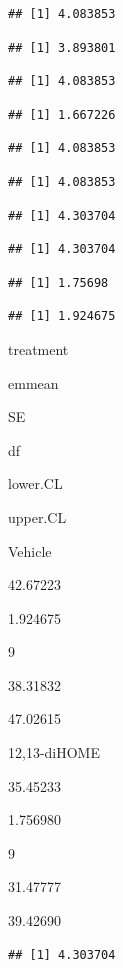 \documentclass[]{book}
\begin{document}
\begin{verbatim}
## [1] 4.083853
\end{verbatim}

\begin{verbatim}
## [1] 3.893801
\end{verbatim}

\begin{verbatim}
## [1] 4.083853
\end{verbatim}

\begin{verbatim}
## [1] 1.667226
\end{verbatim}

\begin{verbatim}
## [1] 4.083853
\end{verbatim}

\begin{verbatim}
## [1] 4.083853
\end{verbatim}

\begin{verbatim}
## [1] 4.303704
\end{verbatim}

\begin{verbatim}
## [1] 4.303704
\end{verbatim}

\begin{verbatim}
## [1] 1.75698
\end{verbatim}

\begin{verbatim}
## [1] 1.924675
\end{verbatim}

treatment

emmean

SE

df

lower.CL

upper.CL

Vehicle

42.67223

1.924675

9

38.31832

47.02615

12,13-diHOME

35.45233

1.756980

9

31.47777

39.42690

\begin{verbatim}
## [1] 4.303704
\end{verbatim}
\end{document}
